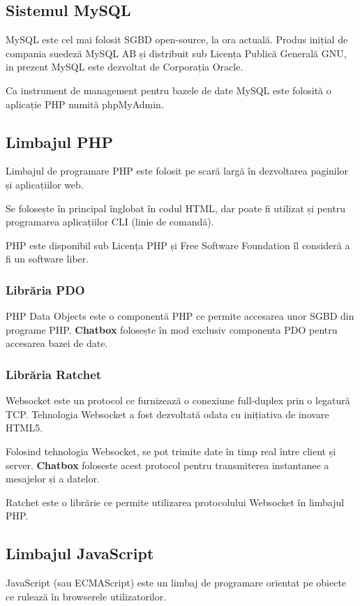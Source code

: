 \documentclass[12pt,a4paper]{article}
\begin{document}
\subsection{Sistemul MySQL}
MySQL\cite{mysql} este cel mai folosit SGBD\citep{sgbd} open-source, 
la ora actuală. Produs inițial de compania suedeză MySQL AB 
și distribuit sub Licența Publică Generală GNU\cite{free}, 
in prezent MySQL este dezvoltat
de Corporația Oracle.

Ca instrument de management pentru bazele de date MySQL
este folosită o aplicație PHP numită phpMyAdmin.

\subsection{Limbajul PHP}
Limbajul de programare PHP\citep{php} este folosit pe scară largă 
în dezvoltarea paginilor și aplicațiilor web.

Se folosește în principal înglobat în codul HTML, dar poate fi 
utilizat și pentru programarea aplicațiilor CLI (linie de comandă).

PHP este disponibil sub Licenṭa PHP ṣi Free Software Foundation 
îl consideră a fi un software liber\citep{free}.

\subsubsection{Librăria PDO}
PHP Data Objects\citep{pdo} este o componentă PHP ce permite accesarea unor SGBD din
programe PHP. \textbf{Chatbox} folosește  în mod exclusiv componenta PDO pentru 
accesarea bazei de date. 

\subsubsection{Librăria Ratchet}
Websocket\citep{websocket} este un protocol ce furnizează o conexiune full-duplex prin o legatură TCP. Tehnologia Websocket a fost dezvoltată odata cu inițiativa de 
inovare HTML5. 

Folosind tehnologia Websocket, se pot trimite date în timp real între 
client și server. \textbf{Chatbox} foloseste acest protocol pentru
transmiterea instantanee a mesajelor și a datelor.

Ratchet\citep{ratchet} este o librărie ce permite utilizarea protocolului 
Websocket în limbajul PHP.

\subsection{Limbajul JavaScript}
JavaScript (sau ECMAScript) este un limbaj de programare orientat pe obiecte\citep{javascript} ce rulează  în browserele utilizatorilor. 
\end{document}
